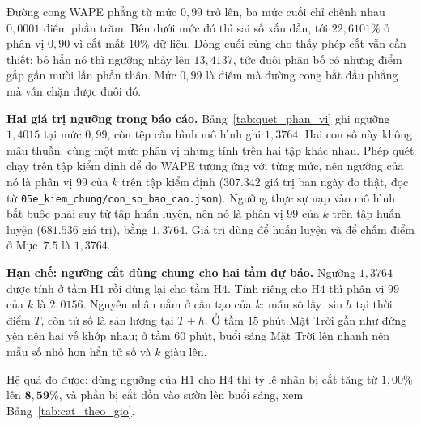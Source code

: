 \documentclass[12pt, a4paper]{report}
\begin{document}
Đường cong WAPE phẳng từ mức $0{,}99$ trở lên, ba mức cuối chỉ chênh nhau $0{,}0001$ điểm
phần trăm. Bên dưới mức đó thì sai số xấu dần, tới $22{,}6101\%$ ở phân vị $0{,}90$ vì cắt mất
$10\%$ dữ liệu. Dòng cuối cùng cho thấy phép cắt vẫn cần thiết: bỏ hẳn nó thì ngưỡng nhảy
lên $13{,}4137$, tức đuôi phân bố có những điểm gấp gần mười lần phần thân. Mức $0{,}99$ là
điểm mà đường cong bắt đầu phẳng mà vẫn chặn được đuôi đó.

\textbf{Hai giá trị ngưỡng trong báo cáo.} Bảng~\ref{tab:quet_phan_vi} ghi ngưỡng $1{,}4015$
tại mức $0{,}99$, còn tệp cấu hình mô hình ghi $1{,}3764$. Hai con số này không mâu thuẫn: cùng
một mức phân vị nhưng tính trên hai tập khác nhau. Phép quét chạy trên tập kiểm định để đo WAPE
tương ứng với từng mức, nên ngưỡng của nó là phân vị $99$ của $k$ trên tập kiểm định
($307.342$ giá trị ban ngày đo thật, đọc từ
\texttt{05e\_kiem\_chung/con\_so\_bao\_cao.json}). Ngưỡng thực sự nạp vào mô hình bắt buộc phải suy từ tập huấn
luyện, nên nó là phân vị $99$ của $k$ trên tập huấn luyện ($681.536$ giá trị), bằng $1{,}3764$.
Giá trị dùng để huấn luyện và để chấm điểm ở Mục~$7.5$ là $1{,}3764$.

\textbf{Hạn chế: ngưỡng cắt dùng chung cho hai tầm dự báo.} Ngưỡng $1{,}3764$ được tính ở tầm
H$1$ rồi dùng lại cho tầm H$4$. Tính riêng cho H$4$ thì phân vị $99$ của $k$ là $2{,}0156$.
Nguyên nhân nằm ở cấu tạo của $k$: mẫu số lấy $\sin h$ tại thời điểm $T$, còn tử số là sản
lượng tại $T+h$. Ở tầm $15$ phút Mặt Trời gần như đứng yên nên hai vế khớp nhau; ở tầm $60$
phút, buổi sáng Mặt Trời lên nhanh nên mẫu số nhỏ hơn hẳn tử số và $k$ giàu lên.

Hệ quả đo được: dùng ngưỡng của H$1$ cho H$4$ thì tỷ lệ nhãn bị cắt tăng từ $1{,}00\%$ lên
$\mathbf{8{,}59\%}$, và phần bị cắt dồn vào sườn lên buổi sáng, xem
Bảng~\ref{tab:cat_theo_gio}.
\end{document}
